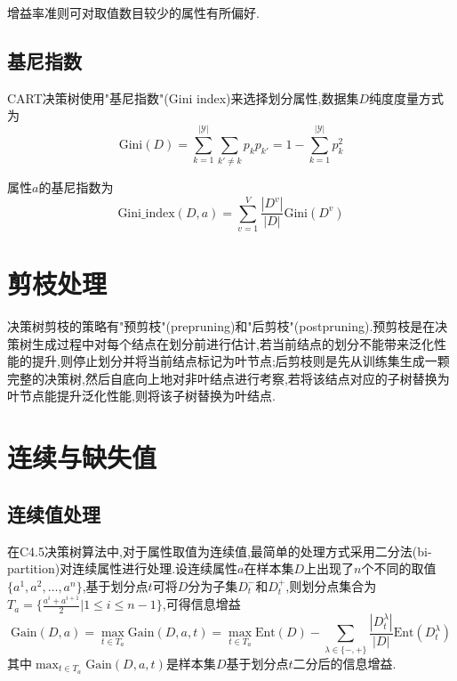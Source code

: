 增益率准则可对取值数目较少的属性有所偏好.

\subsection{基尼指数}

CART决策树使用"基尼指数"(Gini index)来选择划分属性,数据集$D$纯度度量方式为
\begin{equation}
\text{Gini}(D)=\sum_{k=1}^{|\mathcal Y|}\sum_{k'\ne k}p_kp_{k'}=1-\sum_{k=1}^{|\mathcal Y|}p_k^2
\end{equation}

属性$a$的基尼指数为
\begin{equation}
\text{Gini\_index}(D,a)=\sum_{v=1}^V\frac{|D^v|}{|D|}\text{Gini}(D^v)
\end{equation}

\section{剪枝处理}

决策树剪枝的策略有"预剪枝"(prepruning)和"后剪枝"(postpruning).预剪枝是在决策树生成过程中对每个结点在划分前进行估计,若当前结点的划分不能带来泛化性能的提升,则停止划分并将当前结点标记为叶节点;后剪枝则是先从训练集生成一颗完整的决策树,然后自底向上地对非叶结点进行考察,若将该结点对应的子树替换为叶节点能提升泛化性能,则将该子树替换为叶结点.

\section{连续与缺失值}

\subsection{连续值处理}

在C4.5决策树算法中,对于属性取值为连续值,最简单的处理方式采用二分法(bi-partition)对连续属性进行处理.设连续属性$a$在样本集$D$上出现了$n$个不同的取值$\{a^1,a^2,\dots,a^n\}$,基于划分点$t$可将$D$分为子集$D_t^-$和$D_t^+$,则划分点集合为$T_a=\{\frac{a^i+a^{i+1}}{2}|1\le i\le n-1\}$,可得信息增益
\begin{equation}
\text{Gain}(D,a)=\max_{t\in T_a}\text{Gain}(D,a,t)=\max_{t\in T_a}\text{Ent}(D)-\sum_{\lambda\in\{-,+\}}\frac{|D_t^\lambda|}{|D|}\text{Ent}(D_t^\lambda)
\end{equation}
其中$\max_{t\in T_a}\text{Gain}(D,a,t)$是样本集$D$基于划分点$t$二分后的信息增益.

